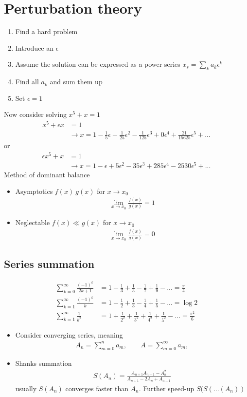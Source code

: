 \documentclass[../main.tex]{subfiles}
\begin{document}
\section{Perturbation theory}

\begin{enumerate}
\item Find a hard problem
\item Introduce an $\epsilon$
\item Assume the solution can be expressed as a power series $x_s=\sum_k a_k\epsilon^k$
\item Find all $a_k$ and sum them up
\item Set $\epsilon=1$
\end{enumerate}
Now consider solving $x^5+x=1$
\begin{align}
x^5+\epsilon x&=1\\
&\rightarrow x=1-\frac{1}{5}\epsilon-\frac{1}{25}\epsilon^2-\frac{1}{125}\epsilon^3+0\epsilon^4+\frac{21}{15625}\epsilon^5+...
\end{align}
or
\begin{align}
\epsilon x^5+x&=1\\
&\rightarrow x=1-\epsilon+5\epsilon^2-35\epsilon^3+285\epsilon^4-2530\epsilon^5+...
\end{align}
Method of dominant balance

\begin{itemize}
\item Asymptotics $f(x)~g(x)$ for $x\rightarrow x_0$ 
\begin{align}
\lim_{x\rightarrow x_0}\frac{f(x)}{g(x)}=1
\end{align}
\item Neglectable $f(x)\ll g(x)$ for $x\rightarrow x_0$ 
\begin{align}
\lim_{x\rightarrow x_0}\frac{f(x)}{g(x)}=0
\end{align}
\end{itemize}
\subsection{Series summation}
\begin{align}
\sum_{k=0}^\infty\frac{(-1)^k}{2k+1}&=1-\frac{1}{3}+\frac{1}{5}-\frac{1}{7}+\frac{1}{9}-...=\frac{\pi}{4}\\
\sum_{k=1}^\infty\frac{(-1)^k}{k}&=1-\frac{1}{2}+\frac{1}{3}-\frac{1}{4}+\frac{1}{5}-...=\log 2\\
\sum_{k=1}^\infty\frac{1}{k^2}&=1+\frac{1}{2^2}+\frac{1}{3^2}+\frac{1}{4^2}+\frac{1}{5^2}-...=\frac{\pi^2}{6}
\end{align}
\begin{itemize}
\item Consider converging series, meaning
\begin{align}
A_n=\sum_{m=0}^na_m, \qquad A=\sum_{m=0}^{\infty}a_m,
\end{align}
\item Shanks summation 
\begin{align}
S(A_n)=\frac{A_{n+1}A_{n-1}-A_n^2}{A_{n+1}-2A_n+A_{n-1}}
\end{align}
usually $S(A_n)$ converges faster than $A_n$. Further speed-up $S(S(...(A_n))$
\end{itemize}
\end{document}
